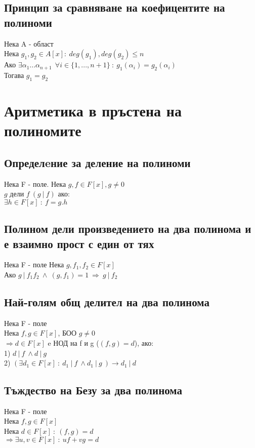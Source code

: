 \documentclass[12pt]{article}
\begin{document}
\subsection{Принцип за сравняване на коефицентите на полиноми}
Нека A - област \\
Нека $g_1, g_2 \in A[x] : \ deg(g_1),deg(g_2)\leq n$ \\
Ако $\exists \alpha_1 ... \alpha_{n+1}\ \ \forall i \in \{1,...,n+1\}\ :\ g_1(\alpha_i) = g_2(\alpha_i)$\\
Тогава $g_1 = g_2$

\section{Аритметика в пръстена на полиномите}

\subsection{Определeние за деление на полиноми}
Нека F - поле.
Нека $g,f \in F[x], g \neq 0$ \\
$g$ дели $f \ (g \ \vert \ f)$ ако:\\
$\exists h \in F[x]\ :\ f=g.h$  

\subsection{Полином дели произведението на два полинома и е взаимно прост с един от тях}
Нека F - поле
Нека $g, f_1, f_2 \in F[x]$\\
Ако $g \ \vert \ f_1f_2\ \land\ (g, f_1)=1\ \Rightarrow\  g \ \vert \ f_2$\\

\subsection{Най-голям общ делител на два полинома}
Нека F - поле \\
Нека $f,g \in F[x]$, БОО $g \neq 0$ \\
$\Rightarrow d \in F[x]$ e НОД на f и g ($(f,g)=d$), ако:\\
1) $d \ \vert \ f \ \land d \ \vert \ g \ $ \\
2) $(\exists d_1 \in F[x]\ :\ d_1 \ \vert \ f \ \land d_1 \ \vert \ g \ ) \rightarrow d_1 \ \vert \ d$

\subsection{Тъждество на Безу за два полинома}
Нека F - поле \\
Нека $f,g \in F[x]$ \\
Нека $d \in F[x]\ :\ (f,g) = d$\\
$\Rightarrow \exists u,v \in F[x]\ :\ uf + vg = d$
\end{document}
